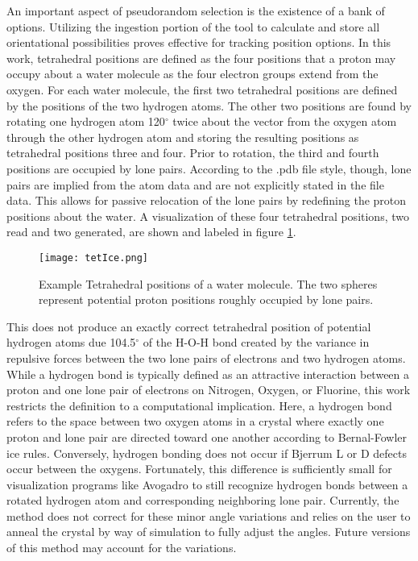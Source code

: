 An important aspect of pseudorandom selection is the existence of a bank of options.
Utilizing the ingestion portion of the tool to calculate and store all orientational possibilities proves effective for tracking position options.
In this work, tetrahedral positions are defined as the four positions that a proton may occupy about a water molecule as the four electron groups extend from the oxygen.
For each water molecule, the first two tetrahedral positions are defined by the positions of the two hydrogen atoms. 
The other two positions are found by rotating one hydrogen atom 120$^{\circ}$ twice about the vector from the oxygen atom through the other hydrogen atom and storing the resulting positions as tetrahedral positions three and four. 
Prior to rotation, the third and fourth positions are occupied by lone pairs.
According to the .pdb file style, though, lone pairs are implied from the atom data and are not explicitly stated in the file data.
This allows for passive relocation of the lone pairs by redefining the proton positions about the water.
A visualization of these four tetrahedral positions, two read and two generated, are shown and labeled in figure \ref{fig:tetXI}.

\begin{figure}
	
	\centering
	
	\texttt{[image: tetIce.png]}
	
	\caption{Example Tetrahedral positions of a water molecule. The two spheres represent potential proton positions roughly occupied by lone pairs.}
	
	\label{fig:tetXI}
	
\end{figure}

This does not produce an exactly correct tetrahedral position of potential hydrogen atoms due 104.5$^{\circ}$ of the H-O-H bond created by the variance in repulsive forces between the two lone pairs of electrons and two hydrogen atoms. 
While a hydrogen bond is typically defined as an attractive interaction between a proton and one lone pair of electrons on Nitrogen, Oxygen, or Fluorine, this work restricts the definition to a computational implication.
Here, a hydrogen bond refers to the space between two oxygen atoms in a crystal where exactly one proton and lone pair are directed toward one another according to Bernal-Fowler ice rules. 
Conversely, hydrogen bonding does not occur if Bjerrum L or D defects occur between the oxygens.
Fortunately, this difference is sufficiently small for visualization programs like Avogadro to still recognize hydrogen bonds between a rotated hydrogen atom and corresponding neighboring lone pair. 
Currently, the method does not correct for these minor angle variations and relies on the user to anneal the crystal by way of simulation to fully adjust the angles. 
Future versions of this method may account for the variations.

